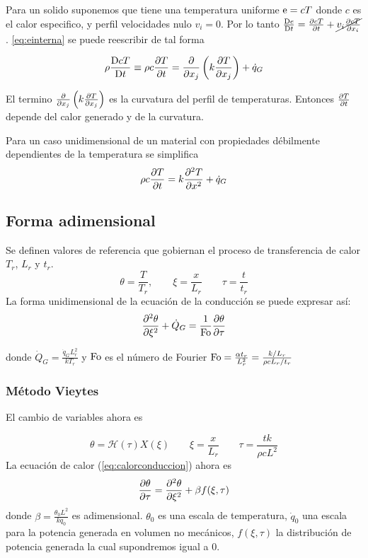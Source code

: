 Para un solido suponemos que tiene una temperatura uniforme $\textrm{e} = cT$ donde $c$ es el calor especifico, y perfil velocidades nulo $v_i=0$. Por lo tanto $\frac{\textrm{D} e}{\textrm{D} t}=\frac{\partial cT}{\partial t}+\cancel{v_i\frac{\partial cT}{\partial x_i}}$. \ref{eq:einterna} se puede reescribir de tal forma

\begin{equation} \label{eq:calorconduccion}
    \rho \frac{\textrm{D} c T}{\textrm{D} t}\equiv \rho c \frac{\partial T}{\partial t} = \frac{\partial  }{\partial x_j}\left( k\frac{\partial T}{\partial x_j} \right) + \dot{q}_G
\end{equation}

El termino $\frac{\partial  }{\partial x_j}\left( k\frac{\partial T}{\partial x_j} \right)$ es la curvatura del perfil de temperaturas. Entonces $\frac{\partial T}{\partial t}$ depende del calor generado y de la curvatura.

Para un caso unidimensional de un material con propiedades débilmente dependientes de la temperatura se simplifica
\begin{equation}\label{eq:conduccion1D}
    \rho c \frac{\partial T}{\partial t} = k\frac{\partial^2 T}{\partial x ^2} + \dot{q}_G 
\end{equation}

\subsection{Forma adimensional}
Se definen valores de referencia que gobiernan el proceso de transferencia de calor $T_r$, $L_r$ y $t_r$.
$$\theta=\frac{T}{T_r},\qquad\xi =\frac{x}{L_r}\qquad\tau=\frac{t}{t_r}$$
La forma unidimensional de la ecuación de la conducción se puede expresar así:
$$ \frac{\partial^2 \theta}{\partial \xi ^2}+\dot{Q}_G=\frac{1}{\textrm{Fo}} \frac{\partial \theta}{\partial \tau}$$

donde $\dot{Q}_G=\frac{\dot{q}_GL_r^2}{kT_r}$ y $\textrm{Fo}$ es el número de Fourier $\textrm{Fo}=\frac{\alpha t_r}{L_r^2}=\frac{k/L_r}{\rho cL_r/t_r}$
\subsubsection{Método Vieytes}
El cambio de variables ahora es

$$\theta=\mathscr{H}(\tau) X(\xi)\qquad \xi = \frac{x}{L_r}\qquad  \tau=\frac{tk}{\rho cL^2}$$
La ecuación de calor (\ref{eq:calorconduccion}) ahora es
\begin{equation}\label{eq:calorvieytesconduccionadimensional}
    \frac{\partial \theta}{\partial \tau}=\frac{\partial^2 \theta}{\partial \xi ^2}+\beta f(\xi,\tau)
\end{equation}
donde $\beta=\frac{\theta_0 L^2}{k\dot{q}_0}$ es adimensional. $\theta_0$ es una escala de temperatura, $\dot{q}_0$  una escala para la potencia generada en volumen no mecánicos, $f(\xi,\tau)$ la distribución de potencia generada la cual supondremos igual a $0$.

